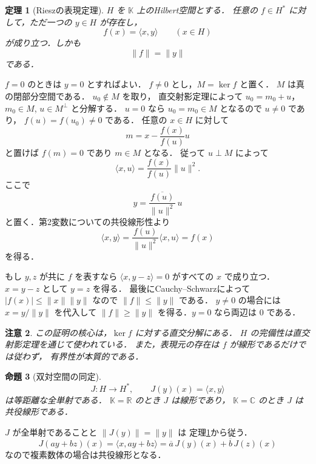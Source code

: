 \documentclass[a5paper,10pt,onecolumn]{jsarticle}
\makeatletter
\theoremstyle{mathnotetheorem}
\newtheorem{theorem}{定理}[section]
\newtheorem{proposition}[theorem]{命題}
\newtheorem{remark}[theorem]{注意}
\renewcommand{\proofname}{証明}
\renewenvironment{proof}[1][\proofname]{%
  \par\pushQED{\qed}\normalfont\topsep4\p@\@plus2\p@\relax
  \trivlist\item[\hskip\labelsep\bfseries #1]\ignorespaces
}{\popQED\endtrivlist\@endpefalse}
\makeatother
\begin{document}
\begin{theorem}[Rieszの表現定理]\label{thm:riesz}
$H$ を $\mathbb K$ 上のHilbert空間とする．
任意の $f\in H^*$ に対して，ただ一つの $y\in H$ が存在し，
\[
 f(x)=\langle x,y\rangle\qquad(x\in H)
\]
が成り立つ．しかも
\[
 \|f\|=\|y\|
\]
である．
\end{theorem}
\begin{proof}
$f=0$ のときは $y=0$ とすればよい．
$f\ne0$ とし，$M=\ker f$ と置く．
$M$ は真の閉部分空間である．
$u_0\notin M$ を取り，
直交射影定理によって
$u_0=m_0+u$，$m_0\in M$, $u\in M^\perp$
と分解する．
$u=0$ なら $u_0=m_0\in M$ となるので $u\ne0$ であり，
$f(u)=f(u_0)\ne0$ である．
任意の $x\in H$ に対して
\[
 m=x-\frac{f(x)}{f(u)}u
\]
と置けば $f(m)=0$ であり $m\in M$ となる．
従って $u\perp M$ によって
\[
 \langle x,u\rangle
 =\frac{f(x)}{f(u)}\|u\|^2.
\]
ここで
\[
 y=\frac{\overline{f(u)}}{\|u\|^2}\,u
\]
と置く．第2変数についての共役線形性より
\[
 \langle x,y\rangle
 =\frac{f(u)}{\|u\|^2}\langle x,u\rangle=f(x)
\]
を得る．

もし $y,z$ が共に $f$ を表すなら
$\langle x,y-z\rangle=0$ がすべての $x$ で成り立つ．
$x=y-z$ として $y=z$ を得る．
最後にCauchy--Schwarzによって
$|f(x)|\le\|x\|\|y\|$ なので $\|f\|\le\|y\|$ である．
$y\ne0$ の場合には $x=y/\|y\|$ を代入して
$\|f\|\ge\|y\|$ を得る．$y=0$ なら両辺は $0$ である．
\end{proof}

\begin{remark}
この証明の核心は，$\ker f$ に対する直交分解にある．
$H$ の完備性は直交射影定理を通じて使われている．
また，表現元の存在は $f$ が線形であるだけでは従わず，
有界性が本質的である．
\end{remark}

\begin{proposition}[双対空間の同定]\label{prop:dual}
\[
 J:H\longrightarrow H^*,\qquad
 J(y)(x)=\langle x,y\rangle
\]
は等距離な全単射である．
$\mathbb K=\mathbb R$ のとき $J$ は線形であり，
$\mathbb K=\mathbb C$ のとき $J$ は共役線形である．
\end{proposition}
\begin{proof}
$J$ が全単射であることと $\|J(y)\|=\|y\|$ は
定理\ref{thm:riesz}から従う．
\[
 J(ay+bz)(x)
 =\langle x,ay+bz\rangle
 =\overline a\,J(y)(x)+\overline b\,J(z)(x)
\]
なので複素数体の場合は共役線形となる．
\end{proof}
\end{document}
